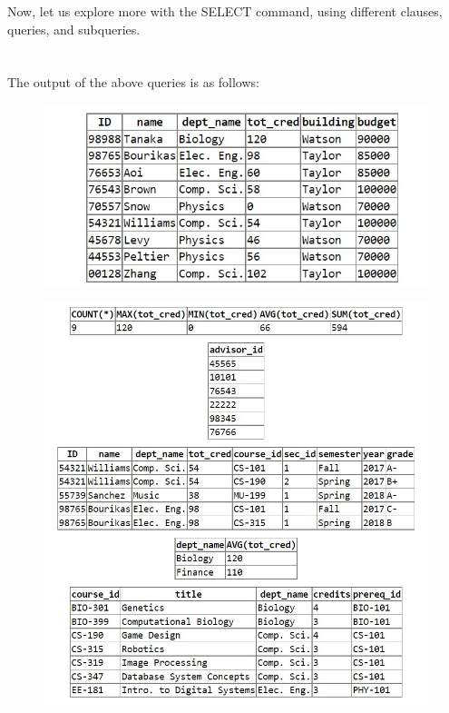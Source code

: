 \documentclass{article}
\begin{document}
Now, let us explore more with the SELECT command, using different clauses, queries, and subqueries.
\newpage \noindent
{
}
\\ \\ \\ The output of the above queries is as follows:
\begin{figure}[!hbt]
    \centering
    \includegraphics[scale=1.2]{pics/select-pic1.jpg}
    \label{fig:sel1}
\end{figure} \newpage \noindent
\begin{figure}[!hbt]
    \centering
    \includegraphics[scale=1.2]{pics/select-pic2.jpg}
    \label{fig:sel1}
\end{figure}
\end{document}
